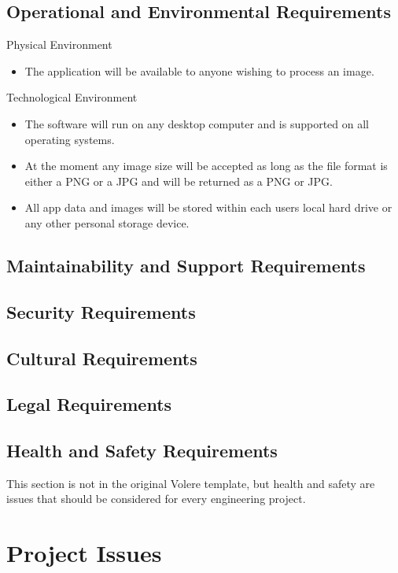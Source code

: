 \documentclass[12pt, titlepage]{article}
\begin{document}
\subsection{Operational and Environmental Requirements}
Physical Environment
\begin{itemize}
\item The application will be available to anyone wishing to process an image.
\end{itemize}
Technological Environment
\begin{itemize}
\item The software will run on any desktop computer and is supported on all operating systems.
\item At the moment any image size will be accepted as long as the file format is either a PNG or a JPG and will be returned as a PNG or JPG.
\item All app data and images will be stored within each users local hard drive or any other personal storage device.
\end{itemize}

\subsection{Maintainability and Support Requirements}

\subsection{Security Requirements}

\subsection{Cultural Requirements}

\subsection{Legal Requirements}

\subsection{Health and Safety Requirements}

This section is not in the original Volere template, but health and safety are
issues that should be considered for every engineering project.

\section{Project Issues}
\end{document}
